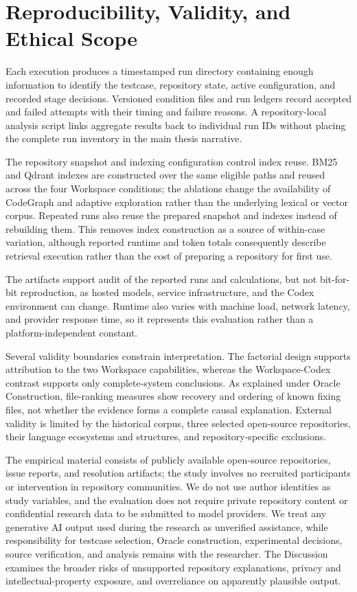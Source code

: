 \section{Reproducibility, Validity, and Ethical Scope}\label{sec:reproducibility-validity-and-ethical-scope}

Each execution produces a timestamped run directory containing enough information to identify the testcase, repository state, active configuration, and recorded stage decisions. Versioned condition files and run ledgers record accepted and failed attempts with their timing and failure reasons. A repository-local analysis script links aggregate results back to individual run IDs without placing the complete run inventory in the main thesis narrative.

The repository snapshot and indexing configuration control index reuse. BM25 and Qdrant indexes are constructed over the same eligible paths and reused across the four Workspace conditions; the ablations change the availability of CodeGraph and adaptive exploration rather than the underlying lexical or vector corpus. Repeated runs also reuse the prepared snapshot and indexes instead of rebuilding them. This removes index construction as a source of within-case variation, although reported runtime and token totals consequently describe retrieval execution rather than the cost of preparing a repository for first use.

The artifacts support audit of the reported runs and calculations, but not bit-for-bit reproduction, as hosted models, service infrastructure, and the Codex environment can change. Runtime also varies with machine load, network latency, and provider response time, so it represents this evaluation rather than a platform-independent constant.

Several validity boundaries constrain interpretation. The factorial design supports attribution to the two Workspace capabilities, whereas the Workspace-Codex contrast supports only complete-system conclusions. As explained under Oracle Construction, file-ranking measures show recovery and ordering of known fixing files, not whether the evidence forms a complete causal explanation. External validity is limited by the historical corpus, three selected open-source repositories, their language ecosystems and structures, and repository-specific exclusions.

The empirical material consists of publicly available open-source repositories, issue reports, and resolution artifacts; the study involves no recruited participants or intervention in repository communities. We do not use author identities as study variables, and the evaluation does not require private repository content or confidential research data to be submitted to model providers. We treat any generative AI output used during the research as unverified assistance, while responsibility for testcase selection, Oracle construction, experimental decisions, source verification, and analysis remains with the researcher. The Discussion examines the broader risks of unsupported repository explanations, privacy and intellectual-property exposure, and overreliance on apparently plausible output.
